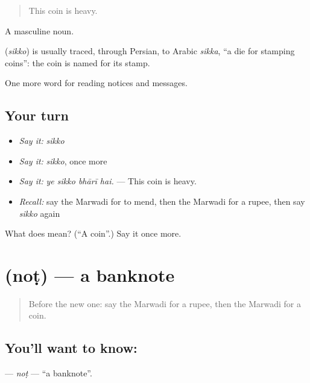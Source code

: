 \begin{quote}
This coin is heavy.
\end{quote}

A masculine noun.

\begin{cousinweb}
\textbf{} (\emph{sikko}) is usually traced, through Persian, to Arabic \emph{sikka}, \textquotedblleft{}a die for stamping coins\textquotedblright{}: the coin is named for its stamp.
\end{cousinweb}

\begin{grammarlens}[title={What you've built}]
One more word for reading notices and messages.
\end{grammarlens}

\subsection*{Your turn}
\begin{itemize}
\raggedright
  \item \emph{Say it:} \emph{sikko}
  \item \emph{Say it:} \emph{sikko}, once more
  \item \emph{Say it:} \emph{ye sikko bhārī hai.} — This coin is heavy.
  \item \emph{Recall:} say the Marwadi for to mend, then the Marwadi for a rupee, then say \emph{sikko} again
\end{itemize}

\begin{tcolorbox}[breakable,colback=teal!4,colframe=teal!35!black,title={Before you move on}]
What does  mean? (\textquotedblleft{}A coin\textquotedblright{}.) Say it once more.
\end{tcolorbox}
\section[\texorpdfstring{\mw{नोट} (noṭ)}{नोट (noṭ)}]{ (noṭ) — a banknote}

\label{lesson:MW-C193-not}



\begin{quote}
Before the new one: say the Marwadi for a rupee, then the Marwadi for a coin.
\end{quote}

\subsection*{You'll want to know: }
\textbf{} — \emph{noṭ} — \textquotedblleft{}a banknote\textquotedblright{}.

